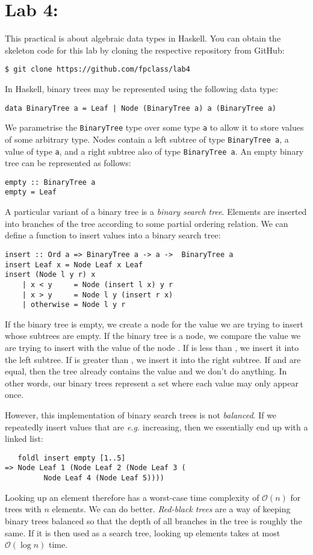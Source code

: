 \section{Lab 4: \practicalFourTitle}

This practical is about algebraic data types in Haskell. You can obtain the skeleton code for this lab by cloning the respective repository from GitHub:
\begin{verbatim}
$ git clone https://github.com/fpclass/lab4
\end{verbatim}
In Haskell, binary trees may be represented using the following data type:
\begin{verbatim}
data BinaryTree a = Leaf | Node (BinaryTree a) a (BinaryTree a)
\end{verbatim}
We parametrise the \texttt{\small BinaryTree} type over some type \texttt{\small a} to allow it to store values of some arbitrary type. Nodes contain a left subtree of type \texttt{\small BinaryTree a}, a value of type \texttt{\small a}, and a right subtree also of type \texttt{\small BinaryTree a}. An empty binary tree can be represented as follows:
\begin{verbatim}
empty :: BinaryTree a
empty = Leaf
\end{verbatim}
A particular variant of a binary tree is a \emph{binary search tree}. Elements are inserted into branches of the tree according to some partial ordering relation. We can define a function to insert values into a binary search tree:
\begin{verbatim}
insert :: Ord a => BinaryTree a -> a ->  BinaryTree a
insert Leaf x = Node Leaf x Leaf
insert (Node l y r) x
    | x < y     = Node (insert l x) y r 
    | x > y     = Node l y (insert r x) 
    | otherwise = Node l y r
\end{verbatim}
If the binary tree is empty, we create a node for the value  we are trying to insert whose subtrees are empty. If the binary tree is a node, we compare the value  we are trying to insert with the value of the node . If  is less than , we insert it into the left subtree. If  is greater than , we insert it into the right subtree. If  and  are equal, then the tree already contains the value and we don't do anything. In other words, our binary trees represent a set where each value may only appear once.

However, this implementation of binary search trees is not \emph{balanced}. If we repeatedly insert values that are \emph{e.g.} increasing, then we essentially end up with a linked list:
\begin{verbatim}
   foldl insert empty [1..5]
=> Node Leaf 1 (Node Leaf 2 (Node Leaf 3 (
         Node Leaf 4 (Node Leaf 5))))
\end{verbatim}
Looking up an element therefore has a worst-case time complexity of $\mathcal{O}(n)$ for trees with $n$ elements. We can do better. \emph{Red-black trees} are a way of keeping binary trees balanced so that the depth of all branches in the tree is roughly the same. If it is then used as a search tree, looking up elements takes at most $\mathcal{O}(\log n)$ time.

